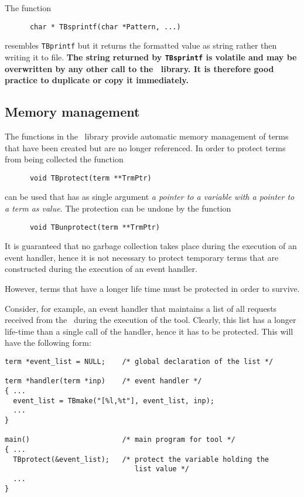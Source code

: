 \noindent The function
\begin{verbatim}
      char * TBsprintf(char *Pattern, ...)
\end{verbatim}
resembles {\tt TBprintf} but it returns the formatted value as string
rather then writing it to file. {\bf The string returned by {\tt TBsprintf}
is volatile and may be overwritten by any other call to the
\TB\ library. It is therefore good practice to duplicate or
copy it immediately.}

\subsection{\label{Memory}Memory management}
The functions in the \TB\ library provide automatic memory management of
terms that have been created but are no longer referenced.
In order to protect terms from being collected the function
\begin{verbatim}
      void TBprotect(term **TrmPtr)
\end{verbatim}
can be used that has as single argument {\em a pointer to a variable
with a pointer to a term as value}. The protection can be undone
by the function
\begin{verbatim}
      void TBunprotect(term **TrmPtr)
\end{verbatim}
It is guaranteed that no garbage collection takes place during
the execution of an event handler, hence it is not necessary to
protect temporary terms that are constructed during the execution
of an event handler.

However, terms that have a longer life time must be protected
in order to survive.

Consider, for example, an event handler that maintains a list
of all requests received from the \TB\ during the execution
of the tool. Clearly, this list has a longer life-time than
a single call of the handler, hence it has to be protected.
This will have the following form:
\begin{verbatim}
term *event_list = NULL;    /* global declaration of the list */

term *handler(term *inp)    /* event handler */
{ ...
  event_list = TBmake("[%l,%t"], event_list, inp);
  ...
}

main()                      /* main program for tool */
{ ...
  TBprotect(&event_list);   /* protect the variable holding the
                               list value */
  ...
}
\end{verbatim}

